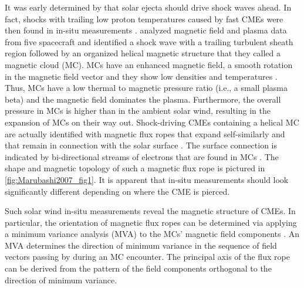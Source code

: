It was early determined by \citet{Gold1962} that solar ejecta should drive shock waves ahead. In fact, shocks with trailing low proton temperatures caused by fast CMEs were then found in in-situ measurements \citep{Gosling1973,Gosling1974}. \citet{Burlaga1981} analyzed magnetic field and plasma data from five spacecraft and identified a shock wave with a trailing turbulent sheath region followed by an organized helical magnetic structure that they called a magnetic cloud (MC). MCs have an enhanced magnetic field, a smooth rotation in the magnetic field vector and they show low densities and temperatures \citep{Burlaga1981}. Thus, MCs have a low thermal to magnetic pressure ratio (i.e., a small plasma beta) and the magnetic field dominates the plasma. Furthermore, the overall pressure in MCs is higher than in the ambient solar wind, resulting in the expansion of MCs on their way out. Shock-driving CMEs containing a helical MC are actually identified with magnetic flux ropes that expand self-similarly and that remain in connection with the solar surface \citep{Chen1997}. The surface connection is indicated by bi-directional streams of electrons that are found in MCs \citep{Gosling1986}. The shape and magnetic topology of such a magnetic flux rope is pictured in \autoref{fig:Marubashi2007_fig1}. It is apparent that in-situ measurements should look significantly different depending on where the CME is pierced.

Such solar wind in-situ measurements reveal the magnetic structure of CMEs. In  particular, the orientation of magnetic flux ropes can be determined via applying a minimum variance analysis (MVA) to the MCs' magnetic field components \citep{Sonnerup1967,Burlaga1982}. An MVA determines the direction of minimum variance in the sequence of field vectors passing by during an MC encounter. The principal axis of the flux rope can be derived from the pattern of the field components orthogonal to the direction of minimum variance.

